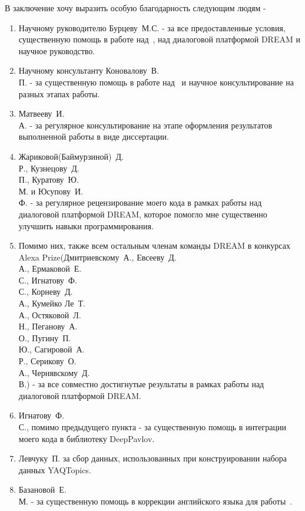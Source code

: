 В заключение хочу выразить особую благодарность следующим людям - 
\begin{enumerate}
\item Научному руководителю Бурцеву~М.\:С. - за все предоставленные условия, существенную помощь в работе над~\cite{dream1,dream1_trudy,dream2,pseudolabel}, над диалоговой платформой DREAM и научное руководство.
\item Научному консультанту Коновалову~В.\\П. - за существенную помощь в работе над~\cite{rumtl,rutopics,enmtl,dp_2023} и научное консультирование на разных этапах работы.
\item Матвееву~И.\\А. - за регулярное консультирование на этапе оформления результатов выполненной работы в виде диссертации.
\item Жариковой(Баймурзиной)~Д.\\Р., Кузнецову~Д.\\П., Куратову~Ю.\\М. и Юсупову~И.\\Ф. - за регулярное рецензирование моего кода в рамках работы над диалоговой платформой DREAM, которое помогло мне существенно улучшить навыки программирования. 
\item Помимо них, также всем остальным членам команды DREAM в конкурсах Alexa Prize(Дмитриевскому~А., Евсееву~Д.\\А., Ермаковой~Е.\\С., Игнатову~Ф.\\С., Корневу~Д.\\А., Кумейко Ле~Т.\\А., Остяковой~Л.\\Н., Пеганову~А.\\О., Пугину~П.\\Ю., Сагировой~А.\\Р., Серикову~О.\\А., Чернявскому~Д.\\В.) - за все совместно достигнутые результаты в рамках работы над диалоговой платформой DREAM. 
\item Игнатову~Ф.\\С., помимо предыдущего пункта - за существенную помощь в интеграции моего кода в библиотеку DeepPavlov.
\item Левчуку~П. за сбор данных, использованных при конструировании набора данных YAQTopics.
\item Базановой~Е.\\М. - за существенную помощь в коррекции английского языка для работы~\cite{enmtl}.

\end{enumerate}
